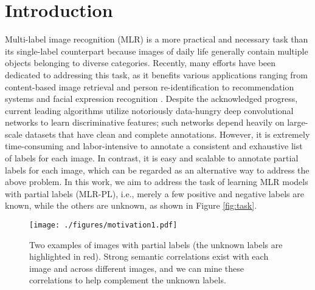 \section{Introduction} 
\label{intro}
Multi-label image recognition (MLR) is a more practical and necessary task than its single-label counterpart because images of daily life generally contain multiple objects belonging to diverse categories. Recently, many efforts \cite{chen2019multi,chen2019learning,chen2022knowledge, zhou2022learning} have been dedicated to addressing this task, as it benefits various applications ranging from content-based image retrieval \cite{li2010technique,zhang2021instance} and person re-identification \cite{wang2022unsupervised, lan2020semi, zhu2021intra} to recommendation systems \cite{carrillo2013multi,zheng2014context} and facial expression recognition \cite{li2019blended, ruan2022adaptive}. Despite the acknowledged progress, current leading algorithms \cite{chen2019multi,chen2019learning,chen2022knowledge} utilize notoriously data-hungry deep convolutional networks \cite{he2016deep,simonyan2015very} to learn discriminative features; such networks depend heavily on large-scale datasets that have clean and complete annotations. However, it is extremely time-consuming and labor-intensive to annotate a consistent and exhaustive list of labels for each image. In contrast, it is easy and scalable to annotate partial labels for each image, which can be regarded as an alternative way to address the above problem. In this work, we aim to address the task of learning MLR models with partial labels (MLR-PL), i.e., merely a few positive and negative labels are known, while the others are unknown, as shown in Figure \ref{fig:task}.

\begin{figure}[!t]
   \centering
   \texttt{[image: ./figures/motivation1.pdf]}
   \caption{Two examples of images with partial labels (the unknown labels are highlighted in red). Strong semantic correlations exist with each image and across different images, and we can mine these correlations to help complement the unknown labels. }
   \label{fig:motivation}
\end{figure}


